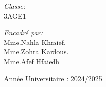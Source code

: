 \begin{titlepage}
\begin{center}
    \bigskip

    {\large \emph{Classe:}}\\[0.25cm]
    {\large 3AGE1}

    \bigskip

    {\large \emph{Encadré par:}}\\[0.25cm]
    {\large Mme.Nahla Khraief.}\\[0.25cm]
   {\large Mme.Zohra  Kardous.}\\[0.25cm]
   {\large Mme.Afef Hfaiedh}\\[0.25cm]



    \bigskip

    

    \vfill
    {\small Année Universitaire : 2024/2025}
  \end{center}

\end{titlepage}

